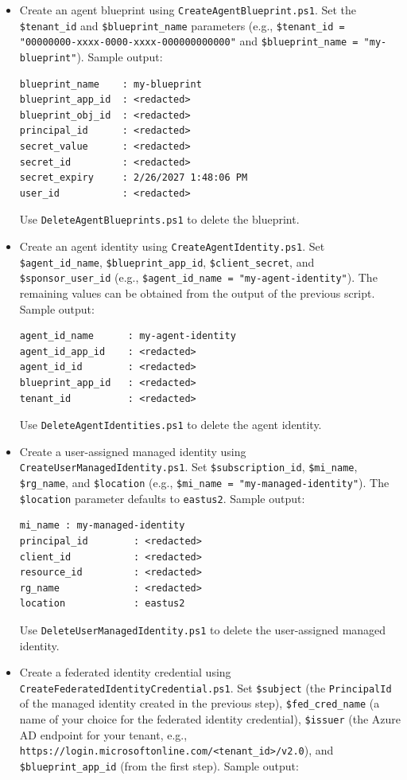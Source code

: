 \documentclass[9pt]{extarticle}%
\begin{document}
\begin{itemize}[topsep=0pt]%
\item Create an agent blueprint using \texttt{CreateAgentBlueprint.ps1}. Set the \texttt{\$tenant\_id} and \texttt{\$blueprint\_name} parameters (e.g., \texttt{\$tenant\_id = "00000000-xxxx-0000-xxxx-000000000000"} and \texttt{\$blueprint\_name = "my-blueprint"}). Sample output:
%
\begin{Verbatim}[fontsize=\small]
blueprint_name    : my-blueprint
blueprint_app_id  : <redacted>
blueprint_obj_id  : <redacted>
principal_id      : <redacted>
secret_value      : <redacted>
secret_id         : <redacted>
secret_expiry     : 2/26/2027 1:48:06 PM
user_id           : <redacted>
\end{Verbatim}
%
Use \texttt{DeleteAgentBlueprints.ps1} to delete the blueprint.
%
\item Create an agent identity using \texttt{CreateAgentIdentity.ps1}. Set \texttt{\$agent\_id\_name}, \texttt{\$blueprint\_app\_id}, \texttt{\$client\_secret}, and \texttt{\$sponsor\_user\_id} (e.g., \texttt{\$agent\_id\_name = "my-agent-identity"}). The remaining values can be obtained from the output of the previous script. Sample output:
%
\begin{Verbatim}[fontsize=\small]
agent_id_name      : my-agent-identity
agent_id_app_id    : <redacted>
agent_id_id        : <redacted>
blueprint_app_id   : <redacted>
tenant_id          : <redacted>
\end{Verbatim}
%
Use \texttt{DeleteAgentIdentities.ps1} to delete the agent identity.
%
\item Create a user-assigned managed identity using \texttt{CreateUserManagedIdentity.ps1}. Set \texttt{\$subscription\_id}, \texttt{\$mi\_name}, \texttt{\$rg\_name}, and \texttt{\$location} (e.g., \texttt{\$mi\_name = "my-managed-identity"}). The \texttt{\$location} parameter defaults to \texttt{eastus2}. Sample output:
%
\begin{Verbatim}[fontsize=\small]
mi_name : my-managed-identity
principal_id        : <redacted>
client_id           : <redacted>
resource_id         : <redacted>
rg_name             : <redacted>
location            : eastus2
\end{Verbatim}
%
Use \texttt{DeleteUserManagedIdentity.ps1} to delete the user-assigned managed identity.
%
\item Create a federated identity credential using \texttt{CreateFederatedIdentityCredential.ps1}. Set \texttt{\$subject} (the \texttt{PrincipalId} of the managed identity created in the previous step), \texttt{\$fed\_cred\_name} (a name of your choice for the federated identity credential), \texttt{\$issuer} (the Azure AD endpoint for your tenant, e.g., \texttt{https://login.microsoftonline.com/<tenant\_id>/v2.0}), and \texttt{\$blueprint\_app\_id} (from the first step). Sample output:

\end{itemize}
\end{document}
